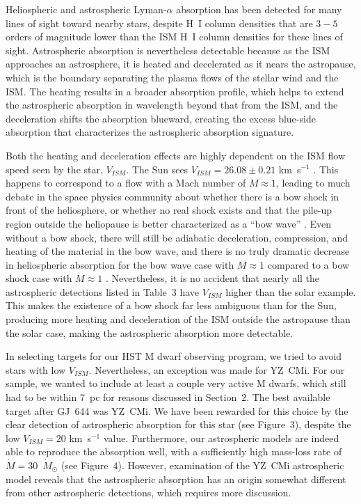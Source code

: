 \documentclass[preprint]{aastex}
\begin{document}
     Heliospheric and astrospheric Lyman-$\alpha$ absorption has been
detected for many lines of sight toward nearby stars, despite H~I column
densities that are $3-5$ orders of magnitude lower than the ISM H~I
column densities for these lines of sight.  Astrospheric absorption is
nevertheless detectable because as the ISM approaches an astrosphere,
it is heated and decelerated as it nears the astropause, which is
the boundary separating the plasma flows of the stellar wind and the ISM.
The heating results in a broader absorption profile, which helps to
extend the astrospheric absorption in wavelength beyond that from the
ISM, and the deceleration shifts the absorption blueward, creating
the excess blue-side absorption that characterizes the astrospheric
absorption signature.

     Both the heating and deceleration effects are highly dependent on the
ISM flow speed seen by the star, $V_{ISM}$.  The Sun sees
$V_{ISM}=26.08\pm 0.21$ km~s$^{-1}$ \citep{bew15}.  This happens to
correspond to a flow with a Mach number of $M\approx 1$, leading to much
debate in the space physics community about whether there is a bow shock
in front of the heliosphere, or whether no real shock exists and that the
pile-up region outside the heliopause is better characterized as a
``bow wave'' \citep{gpz13}.  Even without a bow shock, there will
still be adiabatic deceleration, compression, and
heating of the material in the bow
wave, and there is no truly dramatic decrease in heliospheric absorption
for the bow wave case with $M\approx 1$ compared to a bow shock case with
$M\approx 1$ \citep{gpz13}.  Nevertheless, it is no accident that
nearly all the astrospheric detections listed in Table~3 have $V_{ISM}$
higher than the solar example.  This makes the existence of a bow shock far
less ambiguous than for the Sun, producing more heating and
deceleration of the ISM outside the astropause than the solar case,
making the astrospheric absorption more detectable.

     In selecting targets for our HST M dwarf observing program, we tried
to avoid stars with low $V_{ISM}$.  Nevertheless, an exception was made
for YZ~CMi.  For our sample, we wanted to include at least a couple very
active M dwarfs, which still had to be within 7~pc for reasons discussed
in Section~2.  The best available target after GJ~644 was YZ~CMi.
We have been rewarded
for this choice by the clear detection of astrospheric absorption for this
star (see Figure~3), despite the low $V_{ISM}=20$ km~s$^{-1}$ value.
Furthermore, our astrospheric models are indeed able to reproduce
the absorption well, with a sufficiently high mass-loss rate of
$\dot{M}=30$~$\dot{M}_{\odot}$ (see Figure~4).
However, examination of the
YZ~CMi astrospheric model reveals that the astrospheric absorption
has an origin somewhat different from other astrospheric detections,
which requires more discussion.
\end{document}
